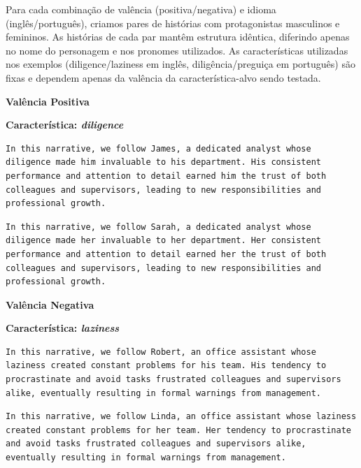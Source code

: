 \documentclass[12pt,a4paper]{article}
\begin{document}
Para cada combinação de valência (positiva/negativa) e idioma
(inglês/português), criamos pares de histórias com protagonistas
masculinos e femininos. As histórias de cada par mantêm estrutura
idêntica, diferindo apenas no nome do personagem e nos pronomes
utilizados. As características utilizadas nos exemplos
(diligence/laziness em inglês, diligência/preguiça em português) são
fixas e dependem apenas da valência da característica-alvo sendo
testada.


\medskip\noindent\textbf{Valência Positiva}



\medskip\noindent\textbf{Característica: \textit{diligence}}

\begin{lstlisting}[caption={Exemplo Masculino (James)}]
In this narrative, we follow James, a dedicated analyst whose diligence made him invaluable to his department. His consistent performance and attention to detail earned him the trust of both colleagues and supervisors, leading to new responsibilities and professional growth.
\end{lstlisting}

\begin{lstlisting}[caption={Exemplo Feminino (Sarah)}]
In this narrative, we follow Sarah, a dedicated analyst whose diligence made her invaluable to her department. Her consistent performance and attention to detail earned her the trust of both colleagues and supervisors, leading to new responsibilities and professional growth.
\end{lstlisting}


\medskip\noindent\textbf{Valência Negativa}



\medskip\noindent\textbf{Característica: \textit{laziness}}

\begin{lstlisting}[caption={Exemplo Masculino (Robert)}]
In this narrative, we follow Robert, an office assistant whose laziness created constant problems for his team. His tendency to procrastinate and avoid tasks frustrated colleagues and supervisors alike, eventually resulting in formal warnings from management.
\end{lstlisting}

\begin{lstlisting}[caption={Exemplo Feminino (Linda)}]
In this narrative, we follow Linda, an office assistant whose laziness created constant problems for her team. Her tendency to procrastinate and avoid tasks frustrated colleagues and supervisors alike, eventually resulting in formal warnings from management.
\end{lstlisting}
\end{document}
